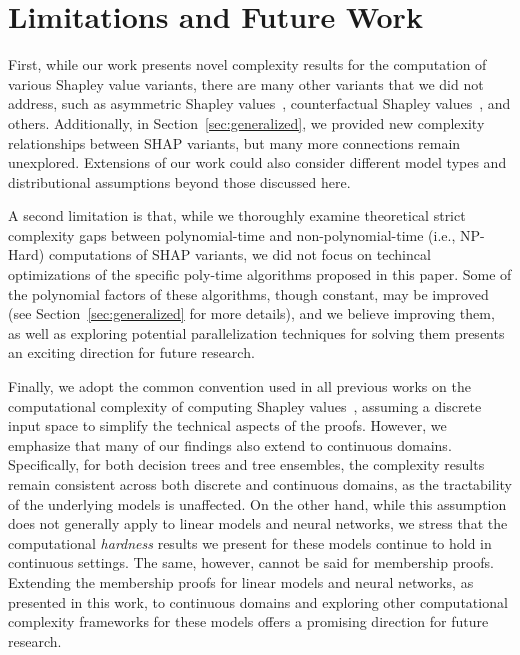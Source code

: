 \section{Limitations and Future Work} \label{app:limitations}
First, while our work presents novel complexity results for the computation of various Shapley value variants, there are many other variants that we did not address, such as asymmetric Shapley values~\citep{frye20}, counterfactual Shapley values~\citep{albini22}, and others. Additionally, in Section~\ref{sec:generalized}, we provided new complexity relationships between SHAP variants, but many more connections remain unexplored. Extensions of our work could also consider different model types and distributional assumptions beyond those discussed here.

A second limitation is that, while we thoroughly examine theoretical strict complexity gaps between polynomial-time and non-polynomial-time (i.e., NP-Hard) computations of SHAP variants, we did not focus on techincal optimizations of the specific poly-time algorithms proposed in this paper. Some of the polynomial factors of these algorithms, though constant, may be improved (see Section~\ref{sec:generalized} for more details), and we believe improving them, as well as exploring potential parallelization techniques for solving them presents an exciting direction for future research.

Finally, we adopt the common convention used in all previous works on the computational complexity of computing Shapley values~\citep{arenas23, vander21, marzouk24a, huangupdates}, assuming a discrete input space to simplify the technical aspects of the proofs. However, we emphasize that many of our findings also extend to continuous domains. Specifically, for both decision trees and tree ensembles, the complexity results remain consistent across both discrete and continuous domains, as the tractability of the underlying models is unaffected. On the other hand, while this assumption does not generally apply to linear models and neural networks, we stress that the computational \emph{hardness} results we present for these models continue to hold in continuous settings. The same, however, cannot be said for membership proofs. Extending the membership proofs for linear models and neural networks, as presented in this work, to continuous domains and exploring other computational complexity frameworks for these models offers a promising direction for future research.

